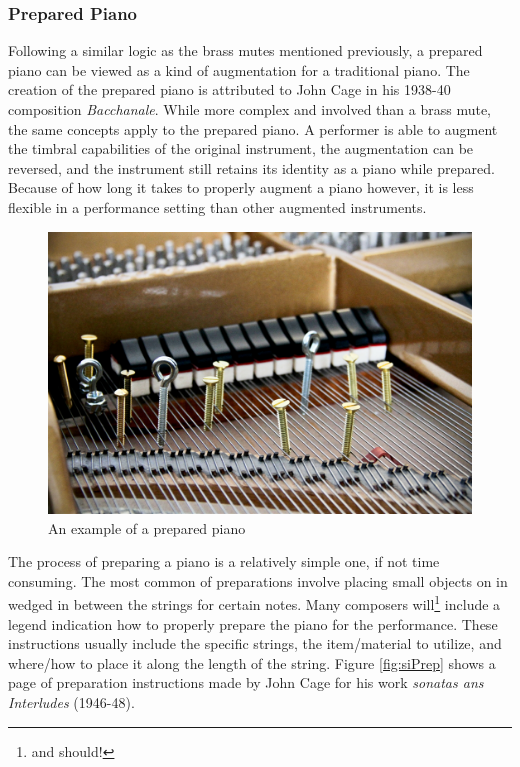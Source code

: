 \subsubsection{Prepared Piano}

Following a similar logic as the brass mutes mentioned previously, a prepared piano can be viewed as a kind of augmentation for a traditional piano. The creation of the prepared piano is attributed to John Cage in his 1938-40 composition \textit{Bacchanale}. While more complex and involved than a brass mute, the same concepts apply to the prepared piano. A performer is able to augment the timbral capabilities of the original instrument, the augmentation can be reversed, and the instrument still retains its identity as a piano while prepared. Because of how long it takes to properly augment a piano however, it is less flexible in a performance setting than other augmented instruments. 

\begin{figure}
    \centering
    \includegraphics[scale=0.2]{diagrams/IMG_9734_1.jpg}
    \caption{An example of a prepared piano} %
    \label{fig:pp}
\end{figure}

The process of preparing a piano is a relatively simple one, if not time consuming. The most common of preparations involve placing small objects on in wedged in between the strings for certain notes. Many composers will\footnote{and should!} include a legend indication how to properly prepare the piano for the performance. These instructions usually include the specific strings, the item/material to utilize, and where/how to place it along the length of the string. Figure \ref{fig:siPrep} shows a page of preparation instructions made by John Cage for his work \textit{sonatas ans Interludes} (1946-48).


